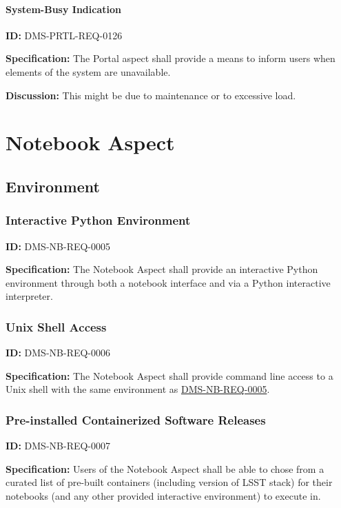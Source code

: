 \documentclass[SE,toc]{lsstdoc}
\begin{document}
\paragraph{System-Busy Indication}\hfill  %

\label{DMS-PRTL-REQ-0126}
\textbf{ID:} DMS-PRTL-REQ-0126

\textbf{Specification:}
The Portal aspect shall provide a means to inform users when elements of the system are unavailable.

\textbf{Discussion:}
This might be due to maintenance or to excessive load.

\section{Notebook Aspect}

\subsection{Environment}

\subsubsection{Interactive Python Environment}

\label{DMS-NB-REQ-0005}
\textbf{ID:} DMS-NB-REQ-0005

\textbf{Specification:}
The Notebook Aspect shall provide an interactive Python environment through both a notebook interface and via a Python interactive interpreter.

\subsubsection{Unix Shell Access}

\label{DMS-NB-REQ-0006}
\textbf{ID:} DMS-NB-REQ-0006

\textbf{Specification:}
The Notebook Aspect shall provide command line access to a Unix shell with the same environment as \hyperref[DMS-NB-REQ-0005]{DMS-NB-REQ-0005}.

\subsubsection{Pre-installed Containerized Software Releases}

\label{DMS-NB-REQ-0007}
\textbf{ID:} DMS-NB-REQ-0007

\textbf{Specification:}
Users of the Notebook Aspect shall be able to chose from a curated list of pre-built containers (including version of LSST stack) for their notebooks (and any other provided interactive environment) to execute in.
\end{document}
